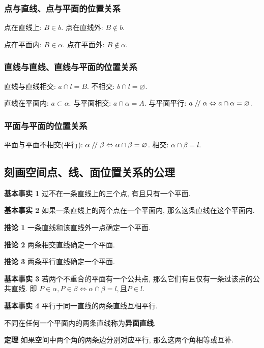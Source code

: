 \documentclass[titlepage]{ctexart}
\renewcommand\parallel{\mathrel{/\mskip-2.5mu/}}
\begin{document}
\subsubsection{点与直线、点与平面的位置关系}

点在直线上: $B \in b$. 点在直线外: $B \notin b$.

点在平面内: $B \in \alpha$. 点在平面外: $B \notin \alpha$.

\subsubsection{直线与直线、直线与平面的位置关系}

直线与直线相交: $a \cap l = B$. 不相交: $b \cap l = \varnothing$.

直线在平面内: $a \subset \alpha$. 与平面相交: $a \cap \alpha = A$. 
与平面平行: $a \parallel \alpha \Leftrightarrow a \cap \alpha = \varnothing$.

\subsubsection{平面与平面的位置关系}

平面与平面不相交(平行): $\alpha \parallel \beta \Leftrightarrow \alpha \cap \beta = \varnothing$.
相交: $\alpha \cap \beta = l$.

\subsection{刻画空间点、线、面位置关系的公理}

\textbf{基本事实 1} \quad 过不在一条直线上的三个点, 有且只有一个平面.

\textbf{基本事实 2} \quad 如果一条直线上的两个点在一个平面内, 那么这条直线在这个平面内.

\textbf{推论 1} \quad 一条直线和该直线外一点确定一个平面.

\textbf{推论 2} \quad 两条相交直线确定一个平面.

\textbf{推论 3} \quad 两条平行直线确定一个平面.

\textbf{基本事实 3} \quad 若两个不重合的平面有一个公共点, 那么它们有且仅有一条过该点的公共直线.
即 $P \in \alpha, P \in \beta \Leftrightarrow \alpha \cap \beta = l, \text{且}P \in l$.

\textbf{基本事实 4} \quad 平行于同一直线的两条直线互相平行.

不同在任何一个平面内的两条直线称为\textbf{异面直线}.

\textbf{定理} \quad 如果空间中两个角的两条边分别对应平行, 那么这两个角相等或互补.
\end{document}
